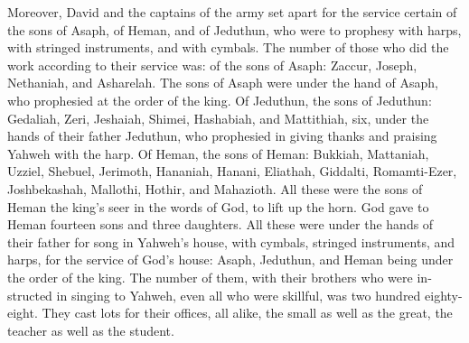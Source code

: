 \begin{paracol}{2}
\begin{otherlanguage}{english}
 Moreover, David and the captains of the army set apart
for the service certain of the sons of Asaph, of Heman, and of Jeduthun,
who were to prophesy with harps, with stringed instruments, and with
cymbals. The number of those who did the work according to their service
was:  of the sons of Asaph: Zaccur, Joseph, Nethaniah, and
Asharelah. The sons of Asaph were under the hand of Asaph, who
prophesied at the order of the king.  Of Jeduthun, the
sons of Jeduthun: Gedaliah, Zeri, Jeshaiah, Shimei, Hashabiah, and
Mattithiah, six, under the hands of their father Jeduthun, who
prophesied in giving thanks and praising Yahweh with the harp.
 Of Heman, the sons of Heman: Bukkiah, Mattaniah, Uzziel,
Shebuel, Jerimoth, Hananiah, Hanani, Eliathah, Giddalti, Romamti-Ezer,
Joshbekashah, Mallothi, Hothir, and Mahazioth.  All these
were the sons of Heman the king's seer in the words of God, to lift up
the horn. God gave to Heman fourteen sons and three daughters.
 All these were under the hands of their father for song
in Yahweh's house, with cymbals, stringed instruments, and harps, for
the service of God's house: Asaph, Jeduthun, and Heman being under the
order of the king.  The number of them, with their
brothers who were instructed in singing to Yahweh, even all who were
skillful, was two hundred eighty-eight.  They cast lots
for their offices, all alike, the small as well as the great, the
teacher as well as the student.


\end{otherlanguage}
\end{paracol}
